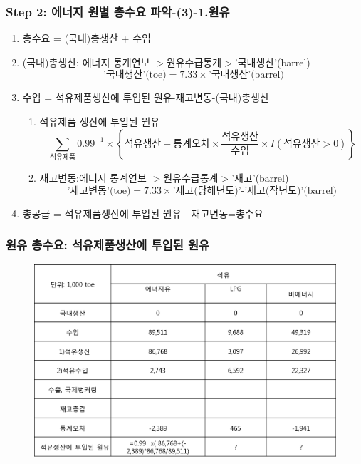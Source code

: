 \documentclass[10pt,compress,slidetop,%
			   hyperref={unicode},xcolor={svgnames},%
			   t]{beamer}
\begin{document}
\begin{frame}
	\frametitle{Step 2: 에너지 원별 총수요 파악-(3)-1.원유}
	\bigskip
	\begin{enumerate}
	\item{총수요 = (국내)총생산 + 수입}
	\item{(국내)총생산: 에너지 통계연보 $>$원유수급통계$>$'국내생산'(barrel)}
	\begin{displaymath}
	\mbox{'국내생산'(toe)} = 7.33 \times \mbox{'국내생산'(barrel)}
	\end{displaymath}
	\item{수입 = 석유제품생산에 투입된 원유-재고변동-(국내)총생산}
		\begin{enumerate}
		\item{석유제품 생산에 투입된 원유
			\begin{displaymath}
			\sum_{\mbox{석유제품}}0.99^{-1}\times\left\{\mbox{석유생산}+\mbox{통계오차}\times\frac{\mbox{석유생산}}{\mbox{수입}}\times I(\mbox{석유생산}>0)\right\}
			\end{displaymath}}
		\item{재고변동:에너지 통계연보 $>$원유수급통계$>$'재고'(barrel)}
			\begin{displaymath}
			\mbox{'재고변동'(toe)} = 7.33 \times \mbox{'재고(당해년도)'-'재고(작년도)'(barrel)}
			\end{displaymath}
		\end{enumerate} 
	\item{총공급 = 석유제품생산에 투입된 원유 - 재고변동=총수요}
	\end{enumerate}
	
\end{frame}

\begin{frame}
	\frametitle{원유 총수요: 석유제품생산에 투입된 원유}
	  	\begin{figure}
	\centering
	 \includegraphics[width=1.00\textwidth]{crude.png}
	\end{figure}	
	
\end{frame}
\end{document}
